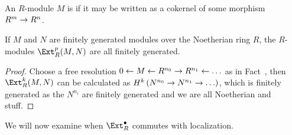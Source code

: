 \documentclass[a4paper,parskip=half,numbers=enddot, DIV=12]{scrreprt}
\begin{document}
\begin{defi}
	An $R$-module $M$ is  if it may be written as a cokernel of some morphism $R^m\morphism R^n$.
\end{defi}
\begin{fact}
	If $M$ and $N$ are finitely generated modules over the Noetherian ring $R$, the $R$-modules $\Ext_R^p(M,N)$ are all finitely generated.
\end{fact}
\begin{proof}
	Choose a free resolution $0\lmorphism M\lmorphism R^{n_0}\morphism R^{n_1}\lmorphism\ldots$ as in Fact~, then $\Ext_R^k(M,N)$ can be calculated as $H^k\left(N^{n_0}\morphism N^{n_1}\morphism\ldots\right)$, which is finitely generated as the $N^{n_i}$ are finitely generated and we are all Noetherian and stuff.
\end{proof}
We will now examine when $\Ext_R^\bullet$ commutes with localization.
\end{document}
